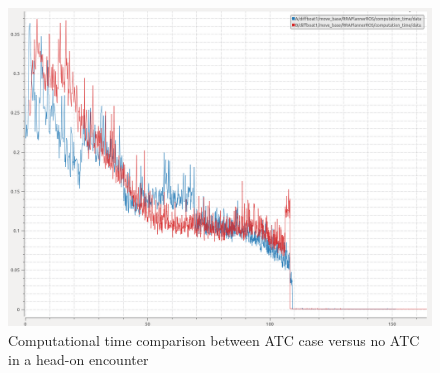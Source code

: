         \begin{figure}[H]
            \centering
            \includegraphics[width=\textwidth]{figs/Chap5/plot_ho_w_vs_wo_CT.png}
            \caption{Computational time comparison between ATC case versus no ATC in a head-on encounter}
            \label{fig:plot_ho_w_vs_wo_CT}
        \end{figure}
        
        
        
        
            
